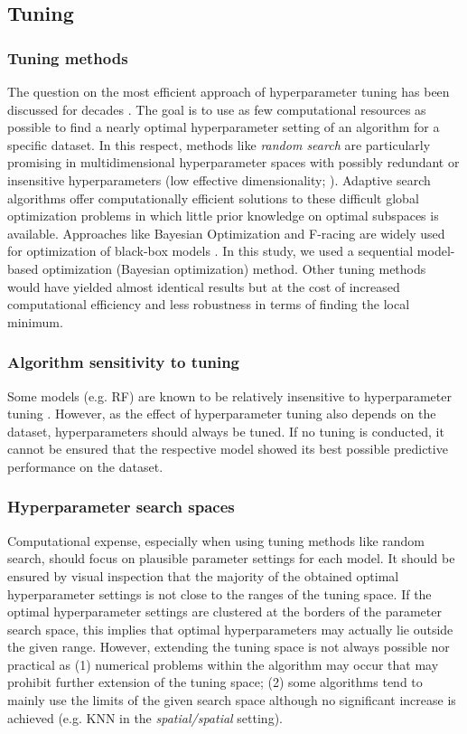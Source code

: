 \documentclass[review]{elsarticle}
\begin{document}
\subsection{Tuning}

\subsubsection{Tuning methods}
The question on the most efficient approach of hyperparameter tuning has been discussed for decades \citep{Bengio2000, Probst2018a, Yang2017}.
The goal is to use as few computational resources as possible to find a nearly optimal hyperparameter setting of an algorithm for a specific dataset.
In this respect, methods like \textit{random search} are particularly promising in multidimensional hyperparameter spaces with possibly redundant or insensitive hyperparameters (low effective dimensionality; \citep{Bergstra2012}).
Adaptive search algorithms offer computationally efficient solutions to these difficult global optimization problems in which little prior knowledge on optimal subspaces is available.
Approaches like Bayesian Optimization and F-racing are widely used for optimization of black-box models \citep{Birattari2002, mlrMBO, Brochu2010, Malkomes2016}.
In this study, we used a sequential model-based optimization (Bayesian optimization) method.
Other tuning methods would have yielded almost identical results but at the cost of increased computational efficiency and less robustness in terms of finding the local minimum.

\subsubsection{Algorithm sensitivity to tuning}
Some models (e.g. \ac{RF}) are known to be relatively insensitive to hyperparameter tuning \citep{Probst2018b}.
However, as the effect of hyperparameter tuning also depends on the dataset, hyperparameters should always be tuned.
If no tuning is conducted, it cannot be ensured that the respective model showed its best possible predictive performance on the dataset.

\subsubsection{Hyperparameter search spaces}
Computational expense, especially when using tuning methods like random search, should focus on plausible parameter settings for each model.
It should be ensured by visual inspection that the majority of the obtained optimal hyperparameter settings is not close to the ranges of the tuning space.
If the optimal hyperparameter settings are clustered at the borders of the parameter search space, this implies that optimal hyperparameters may actually lie outside the given range.
However, extending the tuning space is not always possible nor practical as (1) numerical problems within the algorithm may occur that may prohibit further extension of the tuning space; (2) some algorithms tend to mainly use the limits of the given search space although no significant increase is achieved (e.g. KNN in the \emph{spatial/spatial} setting).
\end{document}
